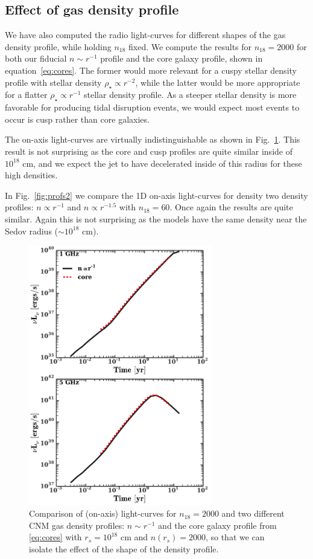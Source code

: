 \documentclass[usenatbib,fleqn]{mnras}
\begin{document}
\subsection{Effect of gas density profile}
\label{sec:profileComp}
We have also computed the radio light-curves for different shapes of
the gas density profile, while holding $n_{18}$ fixed. We compute the
results for $n_{18}=2000$ for both our fiducial $n\sim r^{-1}$ profile and
the core galaxy profile, shown in equation~\eqref{eq:cores}. The
former would more relevant for a cuspy stellar density profile with
stellar density $\rho_{\star}\propto r^{-2}$, while the latter would be more
appropriate for a flatter $\rho_{\star}\propto r^{-1}$ stellar density
profile. As a steeper stellar density is more favorable for producing
tidal disruption events, we would expect most events to occur is cusp
rather than core galaxies.

The on-axis light-curves are virtually indistinguishable as shown in
Fig.~\ref{fig:cores}. This result is not surprising as
the core and cusp profiles are quite similar inside of $10^{18}$ cm,
and we expect the jet to have decelerated inside of this radius for
these high densities. 

In Fig.~\ref{fig:profs2} we compare the 1D on-axis light-curves for
density two density profiles: $n\propto r^{-1}$ and $n\propto r^{-1.5}$
with $n_{18}=60$. Once again the results are quite similar. Again this
is not surprising as the models have the same density near the Sedov
radius ($\sim 10^{18}$ cm).  


\begin{figure} 
  \includegraphics[width=8cm]{fig_cores.pdf}
  \caption{\label{fig:cores} Comparison of (on-axis) light-curves for
    $n_{18}=2000$ and two different CNM gas density profiles: $n\sim
    r^{-1}$ and the core galaxy profile from \eqref{eq:cores} with
    $r_s=10^{18}$ cm and $n(r_s)=2000$, so that we can isolate the
    effect of the shape of the density profile.}
\end{figure}
\end{document}
